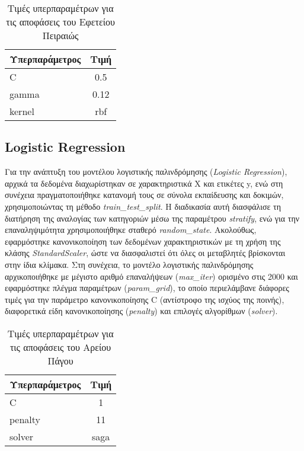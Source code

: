 \documentclass[diploma]{softlab-thesis}
\begin{document}
\begin{enumerate}
\begin{enumerate}
\begin{table}[h!]
\centering
\begin{tabular}{|l|c|}
\hline
\rowcolor[HTML]{FFFFFF} 
\textbf{Υπερπαράμετρος}      & \textbf{Τιμή}    \\ \hline
C           & 0.5 \\ \hline
gamma         &   0.12      \\ \hline
kernel  & rbf       \\ \hline
\end{tabular}
\caption{Τιμές υπερπαραμέτρων για τις αποφάσεις του Εφετείου Πειραιώς}
\end{table}




\subsection{Logistic Regression}

Για την ανάπτυξη του μοντέλου λογιστικής παλινδρόμησης (\textit{Logistic Regression}), αρχικά τα δεδομένα διαχωρίστηκαν σε χαρακτηριστικά X και ετικέτες y, ενώ στη συνέχεια πραγματοποιήθηκε κατανομή τους σε σύνολα εκπαίδευσης και δοκιμών, χρησιμοποιώντας τη μέθοδο \textit{train\_test\_split}. Η διαδικασία αυτή διασφάλισε τη διατήρηση της αναλογίας των κατηγοριών μέσω της παραμέτρου \textit{stratify}, ενώ για την επαναληψιμότητα χρησιμοποιήθηκε σταθερό \textit{random\_state}. Ακολούθως, εφαρμόστηκε κανονικοποίηση των δεδομένων χαρακτηριστικών με τη χρήση της κλάσης \textit{StandardScaler}, ώστε να διασφαλιστεί ότι όλες οι μεταβλητές βρίσκονται στην ίδια κλίμακα. Στη συνέχεια, το μοντέλο λογιστικής παλινδρόμησης αρχικοποιήθηκε με μέγιστο αριθμό επαναλήψεων (\textit{max\_iter}) ορισμένο στις 2000 και εφαρμόστηκε πλέγμα παραμέτρων (\textit{param\_grid}), το οποίο περιελάμβανε διάφορες τιμές για την παράμετρο κανονικοποίησης C (αντίστροφο της ισχύος της ποινής), διαφορετικά είδη κανονικοποίησης (\textit{penalty}) και επιλογές αλγορίθμων (\textit{solver}).

\begin{table}[h!]
\centering
\begin{tabular}{|l|c|}
\hline
\rowcolor[HTML]{FFFFFF} 
\textbf{Υπερπαράμετρος}      & \textbf{Τιμή}    \\ \hline
C           & 1 \\ \hline
penalty         & 11      \\ \hline
solver  & saga       \\ \hline
\end{tabular}
\caption{Τιμές υπερπαραμέτρων για τις αποφάσεις του Αρείου Πάγου}
\end{table}


\end{enumerate}
\end{enumerate}
\end{document}
